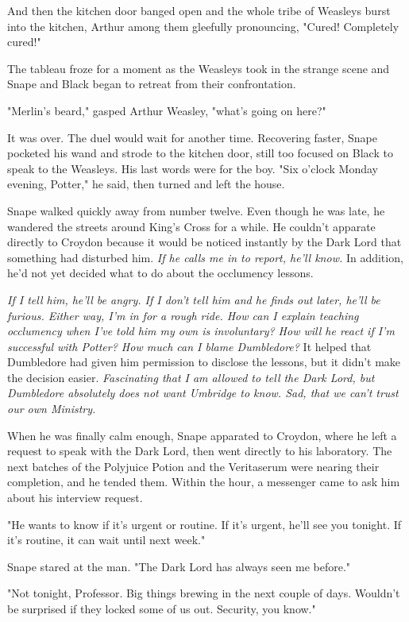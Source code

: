 And then the kitchen door banged open and the whole tribe of Weasleys burst into the kitchen, Arthur among them gleefully pronouncing, "Cured! Completely cured!"

The tableau froze for a moment as the Weasleys took in the strange scene and Snape and Black began to retreat from their confrontation.

"Merlin's beard," gasped Arthur Weasley, "what's going on here?"

It was over. The duel would wait for another time. Recovering faster, Snape pocketed his wand and strode to the kitchen door, still too focused on Black to speak to the Weasleys. His last words were for the boy. "Six o'clock Monday evening, Potter," he said, then turned and left the house.

Snape walked quickly away from number twelve. Even though he was late, he wandered the streets around King's Cross for a while. He couldn't apparate directly to Croydon because it would be noticed instantly by the Dark Lord that something had disturbed him. \emph{If he calls me in to report, he'll know.} In addition, he'd not yet decided what to do about the occlumency lessons.

\emph{If I tell him, he'll be angry. If I don't tell him and he finds out later, he'll be furious. Either way, I'm in for a rough ride. How can I explain teaching occlumency when I've told him my own is involuntary? How will he react if I'm successful with Potter? How much can I blame Dumbledore?} It helped that Dumbledore had given him permission to disclose the lessons, but it didn't make the decision easier. \emph{Fascinating that I am allowed to tell the Dark Lord, but Dumbledore absolutely does not want Umbridge to know. Sad, that we can't trust our own Ministry.}

When he was finally calm enough, Snape apparated to Croydon, where he left a request to speak with the Dark Lord, then went directly to his laboratory. The next batches of the Polyjuice Potion and the Veritaserum were nearing their completion, and he tended them. Within the hour, a messenger came to ask him about his interview request.

"He wants to know if it's urgent or routine. If it's urgent, he'll see you tonight. If it's routine, it can wait until next week."

Snape stared at the man. "The Dark Lord has always seen me before."

"Not tonight, Professor. Big things brewing in the next couple of days. Wouldn't be surprised if they locked some of us out. Security, you know."

